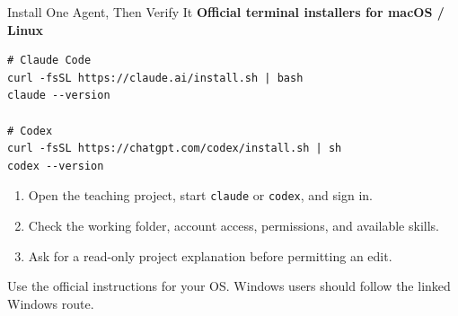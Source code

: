 \begin{frame}[fragile]{Install One Agent, Then Verify It}
\small
\textbf{Official terminal installers for macOS / Linux}
\begin{verbatim}
# Claude Code
curl -fsSL https://claude.ai/install.sh | bash
claude --version

# Codex
curl -fsSL https://chatgpt.com/codex/install.sh | sh
codex --version
\end{verbatim}
\begin{enumerate}
\item Open the teaching project, start \texttt{claude} or \texttt{codex}, and sign in.
\item Check the working folder, account access, permissions, and available skills.
\item Ask for a read-only project explanation before permitting an edit.
\end{enumerate}
\small Use the official instructions for your OS. Windows users should follow the linked Windows route.
\par\vfill
{}
\end{frame}

